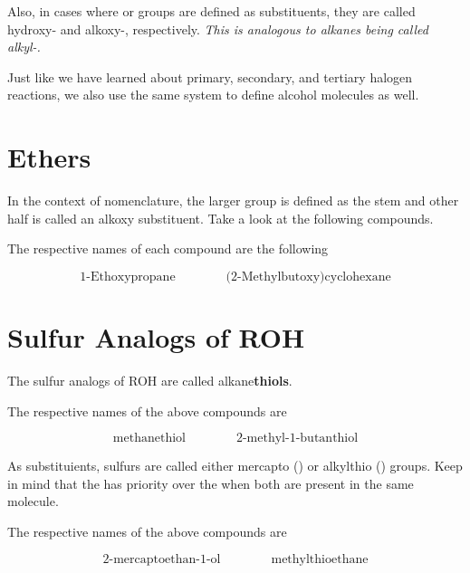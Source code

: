 \documentclass[10pt]{article}
\begin{document}
  Also, in cases where  or  groups are defined as substituents, they are called hydroxy- and alkoxy-, respectively. \textit{This is analogous to alkanes being called alkyl-.}

  Just like we have learned about primary, secondary, and tertiary halogen reactions, we also use the same system to define alcohol molecules as well.


\section{Ethers}

  In the context of nomenclature, the larger group is defined as the stem and other half is called an alkoxy substituent. Take a look at the following compounds.


  The respective names of each compound are the following

  \[
      \text{1-Ethoxypropane}\qquad\qquad\text{(2-Methylbutoxy)cyclohexane}
  \]

\section{Sulfur Analogs of ROH}

  The sulfur analogs of ROH are called alkane\textbf{thiols}. 


  The respective names of the above compounds are

  \[
      \text{methanethiol}\qquad\qquad\text{2-methyl-1-butanthiol}
  \]

  As substituients, sulfurs are called either mercapto () or alkylthio () groups. Keep in mind that the  has priority over the  when both are present in the same molecule.


  The respective names of the above compounds are

  \[
      \text{2-mercaptoethan-1-ol}\qquad\qquad\text{methylthioethane}
  \]
 
\end{document}
